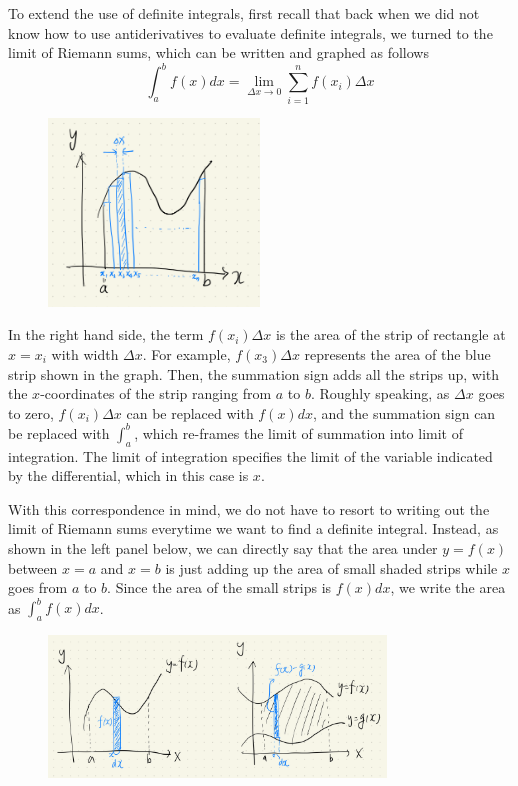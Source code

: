 To extend the use of definite integrals, first recall that back when we did not know how to use antiderivatives to evaluate definite integrals, we turned to the limit of Riemann sums, which can be written and graphed as follows 
\[\int_a^b f(x) dx = \lim_{\Delta x \rightarrow 0} \sum_{i=1}^n f(x_i) \Delta x\]
\begin{figure}[ht]
    \centering
    \includegraphics[width = 0.5\textwidth]{figures/chap 07/Riemann.png}
\end{figure}

\bigskip
In the right hand side, the term $f(x_i) \Delta x$ is the area of the strip of rectangle at $x = x_i$ with width $\Delta x$.  For example, $f(x_3)\Delta x$ represents the area of the blue strip shown in the graph.  Then, the summation sign adds all the strips up, with the $x$-coordinates of the strip ranging from $a$ to $b$.  Roughly speaking, as $\Delta x$ goes to zero, $f(x_i)\Delta x$ can be replaced with $f(x)dx$, and the summation sign can be replaced with $\int_a^b$, which re-frames the limit of summation into limit of integration.  The limit of integration specifies the limit of the variable indicated by the differential, which in this case is $x$.

With this correspondence in mind, we do not have to resort to writing out the limit of Riemann sums everytime we want to find a definite integral.  Instead, as shown in the left panel below, we can directly say that the area under $y = f(x)$ between $x = a$ and $x = b$ is just adding up the area of small shaded strips while $x$ goes from $a$ to $b$.  Since the area of the small strips is $f(x)dx$, we write the area as $\int_a^b f(x)dx$. 

\begin{figure}[ht]
    \centering
    \includegraphics[width = 0.8\textwidth]{figures/chap 07/Differential_Riemann.png}
\end{figure}

